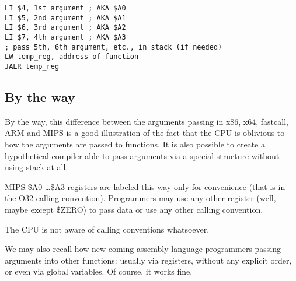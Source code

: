 \begin{lstlisting}[caption=MIPS (O32 calling convention),style=customasmMIPS]
LI $4, 1st argument ; AKA $A0
LI $5, 2nd argument ; AKA $A1
LI $6, 3rd argument ; AKA $A2
LI $7, 4th argument ; AKA $A3
; pass 5th, 6th argument, etc., in stack (if needed)
LW temp_reg, address of function
JALR temp_reg
\end{lstlisting}

\subsection{By the way}

By the way, this difference between the arguments passing in x86, x64, 
fastcall, ARM and MIPS is a good illustration of the fact that the CPU is oblivious to how the arguments are passed to functions. 
It is also possible to create a hypothetical compiler able to pass arguments 
via a special structure without using stack at all.

MIPS \$A0 \dots \$A3 registers are labeled this way only for convenience (that is in the O32 calling convention).
Programmers may use any other register (well, maybe except \$ZERO) 
to pass data or use any other calling convention.

The \ac{CPU} is not aware of calling conventions whatsoever.

We may also recall how new coming assembly language programmers passing arguments into
other functions: usually via registers, without any explicit order, or even via global variables.
Of course, it works fine.

